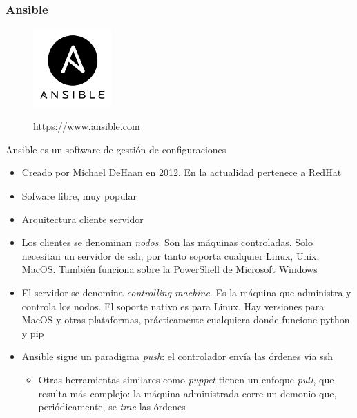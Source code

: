 \documentclass[ucs]{beamer}
\begin{document}
\begin{frame}[fragile]
\frametitle{Ansible}
\begin{figure}
\centerline{\includegraphics[width=3cm]{figs/logo_ansible}}
\url{https://www.ansible.com}
\end{figure}

Ansible es un software de gestión de configuraciones


\begin{itemize}
\item
Creado por
Michael DeHaan en 2012. En la actualidad pertenece a RedHat 

\item
Sofware libre, muy popular

\item
Arquitectura cliente servidor

\end{itemize}
\end{frame}
\begin{frame}[fragile]

\begin{itemize}
\item
 Los clientes se denominan
\emph{nodos}. Son las máquinas controladas. 
Solo necesitan un servidor de ssh, por tanto
soporta cualquier Linux, Unix, MacOS. También funciona sobre la 
PowerShell de Microsoft Windows

\item
El servidor se denomina
\emph{controlling machine}. Es la máquina que administra y controla los nodos.
El soporte nativo es para 
Linux.  Hay versiones para MacOS y otras plataformas, prácticamente
cualquiera donde funcione python y pip

\item
Ansible sigue un 
paradigma \emph{push}: el controlador envía las órdenes
vía ssh

\begin{itemize}
\item
Otras herramientas similares 
como \emph{puppet} tienen
un enfoque
\emph{pull}, 
que resulta más complejo:
la máquina administrada corre un demonio que, periódicamente, se
\emph{trae} las órdenes
\end{itemize}

\end{itemize}
\end{frame}
\end{document}
